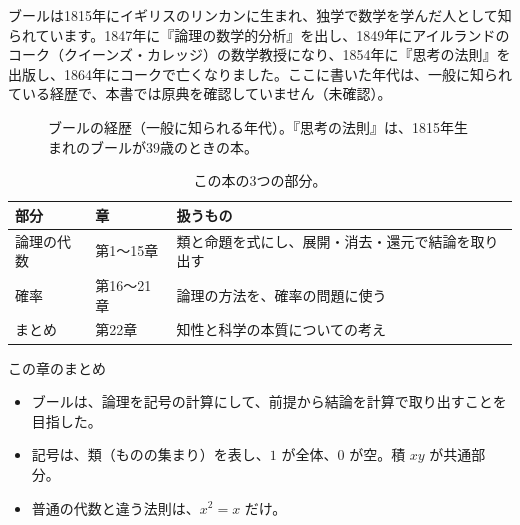 \documentclass[a4paper,11pt,openany]{ltjsbook}
\begin{document}
ブールは1815年にイギリスのリンカンに生まれ、独学で数学を学んだ人として知られています。1847年に『論理の数学的分析』を出し、1849年にアイルランドのコーク（クイーンズ・カレッジ）の数学教授になり、1854年に『思考の法則』を出版し、1864年にコークで亡くなりました。ここに書いた年代は、一般に知られている経歴で、本書では原典を確認していません（未確認）。

\begin{figure}[htbp]
\centering
{}
\caption{ブールの経歴（一般に知られる年代）。『思考の法則』は、1815年生まれのブールが39歳のときの本。}
\end{figure}

\begin{table}[htbp]
\centering
\small
\begin{tabular}{lll}
\toprule
部分 & 章 & 扱うもの\\
\midrule
論理の代数 & 第1〜15章 & 類と命題を式にし、展開・消去・還元で結論を取り出す\\
確率 & 第16〜21章 & 論理の方法を、確率の問題に使う\\
まとめ & 第22章 & 知性と科学の本質についての考え\\
\bottomrule
\end{tabular}
\caption{この本の3つの部分。}
\end{table}

\begin{pointbox}{この章のまとめ}
\begin{itemize}[leftmargin=*]
\item ブールは、論理を記号の計算にして、前提から結論を計算で取り出すことを目指した。
\item 記号は、類（ものの集まり）を表し、$1$ が全体、$0$ が空。積 $xy$ が共通部分。
\item 普通の代数と違う法則は、$x^2=x$ だけ。
\end{itemize}
\end{pointbox}
\end{document}
